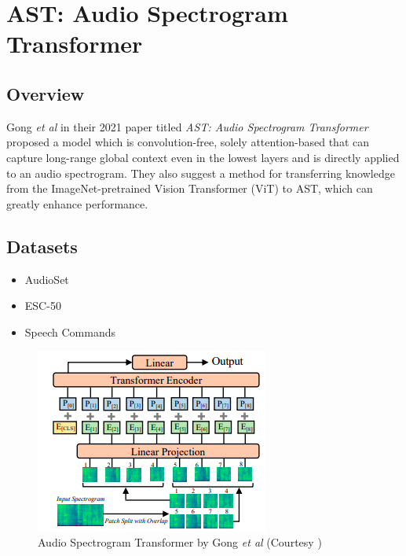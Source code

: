 \section{AST: Audio Spectrogram Transformer} \label{appendix:ast-paper}

\subsection{Overview}

\par Gong \textit{et al} in their 2021 paper titled \textit{AST: Audio Spectrogram Transformer} \cite{ast} proposed a model  which is convolution-free, solely attention-based that can capture long-range global context even in the lowest layers and is directly applied to an audio spectrogram. They also suggest a method for transferring knowledge from the ImageNet-pretrained Vision Transformer (ViT) to AST, which can greatly enhance performance.\par

\subsection{Datasets}
\begin{itemize}
\item AudioSet
\item ESC-50 
\item Speech Commands
\end{itemize}

\begin{figure}[h]
	\centering
	\includegraphics[width=0.5\linewidth]{assets/img/ast_methodology.png}
	\caption{Audio Spectrogram Transformer by Gong
	\textit{et al} (Courtesy \cite{ast})}
\end{figure}

